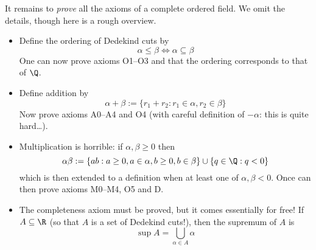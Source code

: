 It remains to \emph{prove} all the axioms of a complete ordered field. We omit the details, though here is a rough overview.
\begin{itemize}
  \item Define the ordering of Dedekind cuts by
	\[\alpha\le\beta\iff\alpha\subseteq\beta\]
	One can now prove axioms O1--O3 and that the ordering corresponds to that of $\Q$.
	\item Define addition by
	\[\alpha+\beta:=\{r_1+r_2:r_1\in\alpha,r_2\in\beta\}\]
	Now prove axioms A0--A4 and O4 (with careful definition of $-\alpha$: this is quite hard\ldots).
	\item Multiplication is horrible: if $\alpha,\beta\ge 0$ then
	\[\alpha\beta:=\{ab:a\ge 0,a\in \alpha,b\ge 0,b\in \beta\}\cup\{q\in\Q:q<0\}\]
	which is then extended to a definition when at least one of $\alpha,\beta<0$. Once can then prove axioms M0--M4, O5 and D.
	\item The completeness axiom must be proved, but it comes essentially for free! If $A\subseteq\R$ (so that $A$ is a set of Dedekind cuts!), then the supremum of $A$ is
	\[\sup A=\bigcup\limits_{\alpha\in A}\alpha\]
\end{itemize}
